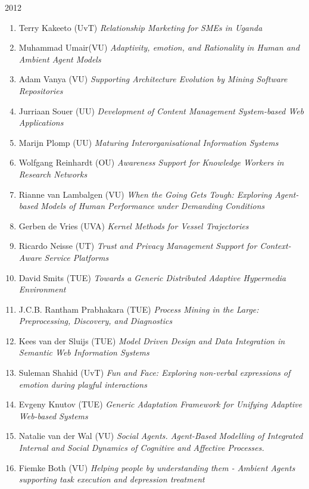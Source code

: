 \begin{multicols}{2}
\begin{scriptsize}
\vspace{0.2cm}
2012
\vspace{0.2cm}
\begin{enumerate}[leftmargin=*,noitemsep,topsep=0pt,parsep=1pt,partopsep=0pt]
\renewcommand{\labelenumi}{2012-\arabic{enumi}}
\item Terry Kakeeto (UvT) \textit{Relationship Marketing for SMEs in Uganda
}\item Muhammad Umair(VU) \textit{Adaptivity, emotion, and Rationality in Human and Ambient Agent Models
}\item Adam Vanya (VU) \textit{Supporting Architecture Evolution by Mining Software Repositories
}\item Jurriaan Souer (UU) \textit{Development of Content Management System-based Web Applications
}\item Marijn Plomp (UU) \textit{Maturing Interorganisational Information Systems
}\item Wolfgang Reinhardt (OU) \textit{Awareness Support for Knowledge Workers in Research Networks
}\item Rianne van Lambalgen (VU) \textit{When the Going Gets Tough: Exploring Agent-based Models of Human Performance under Demanding Conditions
}\item Gerben de Vries (UVA) \textit{Kernel Methods for Vessel Trajectories
}\item Ricardo Neisse (UT) \textit{Trust and Privacy Management Support for Context-Aware Service Platforms
}\item David Smits (TUE) \textit{Towards a Generic Distributed Adaptive Hypermedia Environment
}\item J.C.B. Rantham Prabhakara (TUE) \textit{Process Mining in the Large: Preprocessing, Discovery, and Diagnostics
}\item Kees van der Sluijs (TUE) \textit{Model Driven Design and Data Integration in Semantic Web Information Systems
}\item Suleman Shahid (UvT) \textit{Fun and Face: Exploring non-verbal expressions of emotion during playful interactions
}\item Evgeny Knutov (TUE) \textit{Generic Adaptation Framework for Unifying Adaptive Web-based Systems
}\item Natalie van der Wal (VU) \textit{Social Agents. Agent-Based Modelling of Integrated Internal and Social Dynamics of Cognitive and Affective Processes.
}\item Fiemke Both (VU) \textit{Helping people by understanding them - Ambient Agents supporting task execution and depression treatment
}
\end{enumerate}
\end{scriptsize}
\end{multicols}
